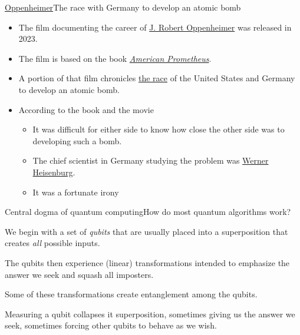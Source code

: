 \begin{frame}{\href{https://en.wikipedia.org/wiki/Oppenheimer\_(film)}{Oppenheimer}}{The race with Germany to develop an atomic bomb}
\begin{itemize}
    \item The film documenting the career of \href{https://en.wikipedia.org/wiki/J.\_Robert\_Oppenheimer}{J. Robert Oppenheimer} was released in 2023.
    \item The film is based on the book \href{https://en.wikipedia.org/wiki/American\_Prometheus}{\textit{American Prometheus}}.
    \item A portion of that film chronicles \href{https://www.osti.gov/opennet/manhattan-project-history/Events/1942-1945/rivals.htm}{the race} of the United States and Germany to develop an atomic bomb.
    \item According to the book and the movie
    \begin{itemize}
        \item It was difficult for either side to know how close the other side was to developing such a bomb.
        \item The chief scientist in Germany studying the problem was \href{https://en.wikipedia.org/wiki/Werner\_Heisenberg}{Werner Heisenburg}.
        \item It was a fortunate irony
    \end{itemize}
\end{itemize}
\end{frame}

\begin{frame}{Central dogma of quantum computing}{How do most quantum algorithms work?}
\begin{description}
    \item<1->[Input] We begin with a set of \emph{qubits} that are usually placed into a superposition that creates \emph{all} possible inputs. 
    \item<2->[Gates] The qubits then experience (linear) transformations intended to emphasize the answer we seek and squash all imposters.  
    
    Some of these transformations create entanglement among the qubits.
    \item<3->[Measurement] Measuring a qubit collapses it superposition, sometimes giving us the answer we seek, sometimes forcing other qubits to behave as we wish.
\end{description}
    
\end{frame}



